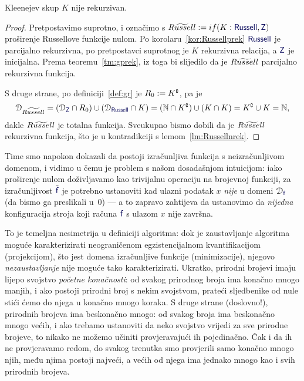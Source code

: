 \begin{teorem}[{name=[nerekurzivnost Kleenejevog skupa]}]\label{tm:DRnrek}
Kleenejev skup $K$ nije rekurzivan.
\end{teorem}
\begin{proof}
Pretpostavimo suprotno, i označimo s $\rus:=\IF{K:\f{Russell},\f Z}$ proširenje Russellove funkcije nulom.
Po korolaru~\ref{kor:Russellprek} $\f{Russell}$ je parcijalno rekurzivna, po pretpostavci suprotnog je $K$ rekurzivna relacija, a $\f Z$ je inicijalna. Prema teoremu~\ref{tm:gprek}, iz toga bi slijedilo da je $\textit{$R\widetilde{usse}ll$}$ parcijalno rekurzivna funkcija.

S druge strane, po definiciji~\ref{def:gr} je $R_0:=K\sp{{\scriptscriptstyle\complement}}$, pa je
\begin{equation}
    \dom{\rus}=(\dom{\f Z}\cap R_0)\cup(\dom{\f{Russell}}\cap K)=(\N\cap K\kompl)\cup(K\cap K)=K\kompl\cup K=\N\text,
\end{equation}
dakle $\textit{$R\widetilde{usse}ll$}$ je totalna funkcija. Sveukupno bismo dobili da je $\textit{$R\widetilde{usse}ll$}$ rekurzivna funkcija, što je u kontradikciji s lemom~\ref{lm:Russellnrek}.%
\end{proof}

Time smo napokon dokazali da postoji izračunljiva funkcija s neizračunljivom domenom, i vidimo u čemu je problem s našom dosadašnjom intuicijom: iako proširenje nulom doživljavamo kao trivijalnu operaciju na brojevnoj funkciji, za izračunljivost $\tilde{\f f}$ je potrebno ustanoviti kad ulazni podatak $x$ \emph{nije} u domeni $\dom{\f f}$ (da bismo ga preslikali u~$0$) --- a to zapravo zahtijeva da ustanovimo da \emph{nijedna} konfiguracija stroja koji računa $\f f$ s ulazom $x$ nije završna.

To je temeljna nesimetrija u definiciji algoritma: dok je zaustavljanje algoritma moguće karakterizirati neograničenom egzistencijalnom kvantifikacijom (projekcijom), što jest domena izračunljive funkcije (minimizacije), njegovo \emph{nezaustavljanje} nije moguće tako karakterizirati. Ukratko, prirodni brojevi imaju lijepo svojstvo \emph{početne konačnosti}: od svakog prirodnog broja ima konačno mnogo manjih, i ako postoji prirodni broj s nekim svojstvom, prateći sljedbenike od nule stići ćemo do njega u konačno mnogo koraka. S druge strane (doslovno!), prirodnih brojeva ima beskonačno mnogo: od svakog broja ima beskonačno mnogo većih, i ako trebamo ustanoviti da neko svojstvo vrijedi za sve prirodne brojeve, to nikako ne možemo učiniti provjeravajući ih pojedinačno. Čak i da ih ne provjeravamo redom, do svakog trenutka smo provjerili samo konačno mnogo njih, među njima postoji najveći, a većih od njega ima jednako mnogo kao i svih prirodnih brojeva.

